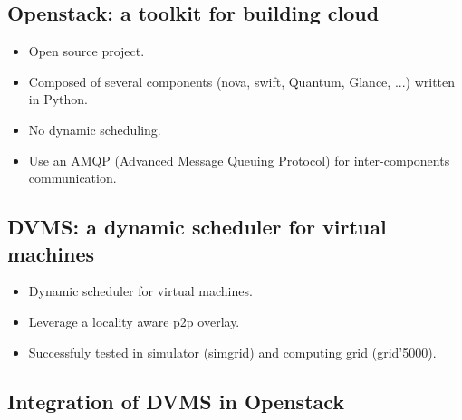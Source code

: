 \subsection{Openstack: a toolkit for building cloud}

\begin{itemize}

	\item Open source project.

	\item Composed of several components (nova, swift, Quantum, Glance, ...) written in Python.

	\item No dynamic scheduling.

	\item Use an AMQP (Advanced Message Queuing Protocol) for inter-components communication.

\end{itemize}



\subsection{DVMS: a dynamic scheduler for virtual machines}

\begin{itemize}

	\item Dynamic scheduler for virtual machines.

	\item Leverage a locality aware p2p overlay.

	\item Successfuly tested in simulator (simgrid) and computing grid (grid'5000).

\end{itemize}


\subsection{Integration of DVMS in Openstack}

